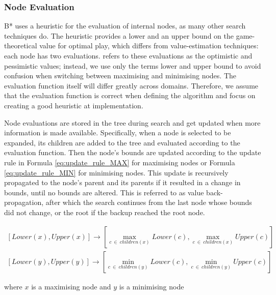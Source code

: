 \subsubsection{Node Evaluation}
B* uses a heuristic for the evaluation of internal nodes, as many other search techniques do. The heuristic provides a lower and an upper bound on the game-theoretical value for optimal play, which differs from value-estimation techniques: each node has two evaluations.  refers to these evaluations as the optimistic and pessimistic values; instead, we use only the terms lower and upper bound to avoid confusion when switching between maximising and minimising nodes. The evaluation function itself will differ greatly across domains. Therefore, we assume that the evaluation function is correct when defining the algorithm and focus on creating a good heuristic at implementation.

Node evaluations are stored in the tree during search and get updated when more information is made available. Specifically, when a node is selected to be expanded, its children are added to the tree and evaluated according to the evaluation function. Then the node’s bounds are updated according to the update rule in Formula \ref{eq:update_rule_MAX} for maximising nodes or Formula \ref{eq:update_rule_MIN} for minimising nodes. This update is recursively propagated to the node’s parent and its parents if it resulted in a change in bounds, until no bounds are altered. This is referred to as value back-propagation, after which the search continues from the last node whose bounds did not change, or the root if the backup reached the root node.

\begin{gather}
\label{eq:update_rule_MAX}
    \left[Lower(x), Upper(x)\right] \to \left[\max_{c~\in~children(x)} Lower(c), \max_{c~\in~children(x)} Upper(c)\right] \\
\label{eq:update_rule_MIN}
    \left[Lower(y), Upper(y)\right] \to \left[\min_{c~\in~children(y)} Lower(c), \min_{c~\in~children(y)} Upper(c)\right]
\end{gather}
\begin{center}
    where $x$ is a maximising node and $y$ is a minimising node
\end{center}

